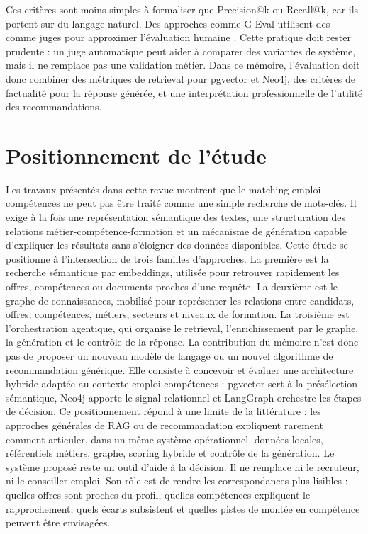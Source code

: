 Ces critères sont moins simples à formaliser que Precision@k ou Recall@k, car ils portent sur du langage naturel. Des approches comme G-Eval utilisent des \LLM{} comme juges pour approximer l'évaluation humaine \cite{liu2023geval}. Cette pratique doit rester prudente : un juge automatique peut aider à comparer des variantes de système, mais il ne remplace pas une validation métier. Dans ce mémoire, l'évaluation doit donc combiner des métriques de retrieval pour pgvector et Neo4j, des critères de factualité pour la réponse générée, et une interprétation professionnelle de l'utilité des recommandations.

\section{Positionnement de l'étude}
Les travaux présentés dans cette revue montrent que le matching emploi-compétences ne peut pas être traité comme une simple recherche de mots-clés. Il exige à la fois une représentation sémantique des textes, une structuration des relations métier-compétence-formation et un mécanisme de génération capable d'expliquer les résultats sans s'éloigner des données disponibles. Cette étude se positionne à l'intersection de trois familles d'approches. La première est la recherche sémantique par embeddings, utilisée pour retrouver rapidement les offres, compétences ou documents proches d'une requête. La deuxième est le graphe de connaissances, mobilisé pour représenter les relations entre candidats, offres, compétences, métiers, secteurs et niveaux de formation. La troisième est l'orchestration agentique, qui organise le retrieval, l'enrichissement par le graphe, la génération et le contrôle de la réponse. La contribution du mémoire n'est donc pas de proposer un nouveau modèle de langage ou un nouvel algorithme de recommandation générique. Elle consiste à concevoir et évaluer une architecture hybride adaptée au contexte emploi-compétences : pgvector sert à la présélection sémantique, Neo4j apporte le signal relationnel et LangGraph orchestre les étapes de décision. Ce positionnement répond à une limite de la littérature : les approches générales de RAG ou de recommandation expliquent rarement comment articuler, dans un même système opérationnel, données locales, référentiels métiers, graphe, scoring hybride et contrôle de la génération. Le système proposé reste un outil d'aide à la décision. Il ne remplace ni le recruteur, ni le conseiller emploi. Son rôle est de rendre les correspondances plus lisibles : quelles offres sont proches du profil, quelles compétences expliquent le rapprochement, quels écarts subsistent et quelles pistes de montée en compétence peuvent être envisagées.

